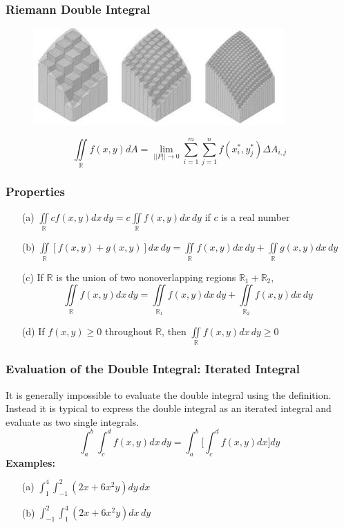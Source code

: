 \documentclass{beamer}
\begin{document}
\begin{frame}
\frametitle{\textbf{Riemann Double Integral}}
\begin{figure}
	\centering
	\includegraphics[width=.95\textwidth]{img_approx.jpg}
	\hspace*{10pt}\hbox{}
\end{figure}
$$\iint\limits_{\mathbb{R}} f(x,y) dA = \lim\limits_{||\mathit{P}||\rightarrow 0} \sum_{i=1}^m \sum_{j=1}^n f(x_i^*,y_j^*)\Delta A_{i,j}$$
\end{frame}

\begin{frame}
\frametitle{\textbf{Properties}}
\begin{itemize}
	\item[(a)] $\iint\limits_{\mathbb{R}} c f(x,y) dx\,dy = c \iint\limits_{\mathbb{R}} f(x,y)dx\,dy$ if $c$ is a real number
	\item[(b)] $\iint\limits_{\mathbb{R}} [f(x,y) + g(x,y)] dx \,dy = \iint\limits_{\mathbb{R}} f(x,y)dx\,dy + \iint\limits_{\mathbb{R}} g(x,y)dx\,dy$
	\item[(c)] If $\mathbb{R}$ is the union of two nonoverlapping regions $\mathbb{R}_1 + \mathbb{R}_2$,
	$$\iint\limits_{\mathbb{R}}f(x,y)dx\,dy = \iint\limits_{\mathbb{R}_1}f(x,y)dx\,dy + \iint\limits_{\mathbb{R}_2}f(x,y)dx\,dy$$
	\item[(d)] If $f(x,y) \geq 0$ throughout $\mathbb{R}$, then $\iint\limits_{\mathbb{R}} f(x,y)dx\,dy \geq 0$
\end{itemize}
\end{frame}

\begin{frame}
\frametitle{\textbf{Evaluation of the Double Integral: Iterated Integral}}
It is generally impossible to evaluate the double integral using the definition. Instead it is typical to express the double integral as an iterated integral and evaluate as two single integrals.
$$\int_a^b \int_c^d f(x,y)dx\,dy = \int_a^b \Bigg[\int_c^d f(x,y)dx\Bigg]dy$$
\vspace{12pt}
\textbf{Examples:}
\begin{itemize}
	\item [(a)] $\int_1^4 \int_{-1}^2 (2x+6x^2y)dy\,dx$
	\item[(b)] $\int_{-1}^2 \int_1^4  (2x+6x^2y)dx\,dy$
\end{itemize}
\end{frame}
\end{document}
